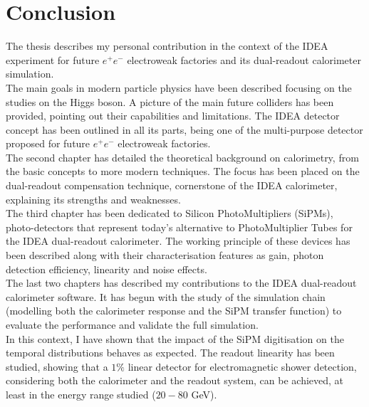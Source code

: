 \chapter*{Conclusion}

The thesis describes my personal contribution in the context of the IDEA experiment for future $e^+ e^-$ electroweak factories and its dual-readout calorimeter simulation.\\

The main goals in modern particle physics have been described focusing on the studies on the Higgs boson. A picture of the main future colliders has been provided, pointing out their capabilities and limitations. The IDEA detector concept has been outlined in all its parts, being one of the multi-purpose detector proposed for future $e^+ e^-$ electroweak factories.\\


The second chapter has detailed the theoretical background on calorimetry, from the basic concepts to more modern techniques. The focus has been placed on the dual-readout compensation technique, cornerstone of the IDEA calorimeter, explaining its strengths and weaknesses.\\

The third chapter has been dedicated to Silicon PhotoMultipliers (SiPMs), photo-detectors that represent today's alternative to PhotoMultiplier Tubes for the IDEA dual-readout calorimeter. The working principle of these devices has been described along with their characterisation features as gain, photon detection efficiency, linearity and noise effects.\\

The last two chapters has described my contributions to the IDEA dual-readout calorimeter software. It has begun with the study of the simulation chain (modelling both the calorimeter response and the SiPM transfer function) to evaluate the performance and validate the full simulation.\\
In this context, I have shown that the impact of the SiPM digitisation on the temporal distributions behaves as expected.
The readout linearity has been studied, showing that a $1\%$ linear detector for electromagnetic shower detection, considering both the calorimeter and the readout system, can be achieved, at least in the energy range studied ($20-80$ GeV).\\


